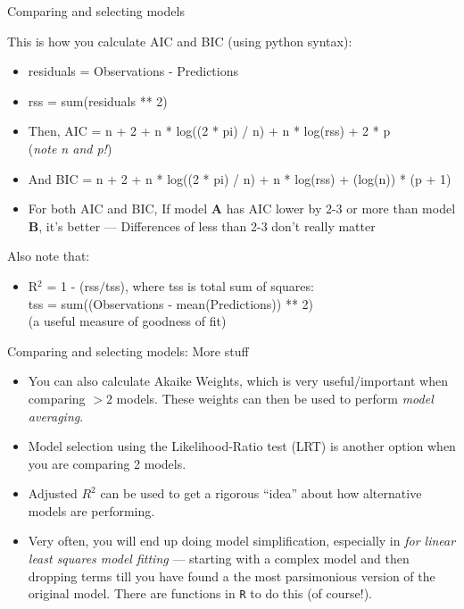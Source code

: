 \documentclass[xcolor=x11names,compress]{beamer}
\renewcommand{\(}{\begin{columns}}
\renewcommand{\)}{\end{columns}}
\newcommand{\<}[1]{\begin{column}{#1}}
\renewcommand{\>}{\end{column}}
\begin{document}
\begin{frame}{Comparing and selecting models}

This is how you calculate AIC and BIC (using python syntax): 

\pause
\begin{itemize}\itemsep10pt
\small
	\item residuals = Observations - Predictions
	\item rss = sum(residuals ** 2) 
	\item Then, AIC = n + 2 + n * log((2 * pi) / n) + n * log(rss) + 2 * p \\
		({\it note n and p!})
	\item And BIC = n + 2 + n * log((2 * pi) / n) + n * log(rss) + (log(n)) * (p + 1)

	\item For both AIC and BIC, If model {\bf A} has AIC lower by 2-3 or 
	more than model {\bf B}, it's better --- Differences of less than 2-3 
	don't really matter

\end{itemize}

    \pause
Also note that:
\begin{itemize}
\small
	\item R$^{2}$ = 1 - (rss$/$tss), where tss is total sum of squares: \\
tss = sum((Observations - mean(Predictions)) ** 2)\\
(a useful measure of goodness of fit)

\end{itemize}

\end{frame}


\begin{frame}{Comparing and selecting models: More stuff}

\begin{itemize} \itemsep12pt
	\item You can also calculate Akaike Weights, which is very useful/important
	when comparing $ > 2$ models. These weights can then be used to perform {\it
	model averaging}.

	\item Model selection using the Likelihood-Ratio test (LRT) is another
	option when you are comparing 2 models.
	
	\item Adjusted $R^2$ can be used to get a rigorous ``idea'' about how
	alternative models are performing. 
	
	\item Very often, you will end up doing  model simplification, especially in
	{\it for linear least squares model fitting} --- starting with a complex
	model and then dropping terms till you have found a the most parsimonious
	version of the original model. There are functions in {\tt R} to do this (of
	course!).
 
\end{itemize}

\end{frame}
\end{document}
